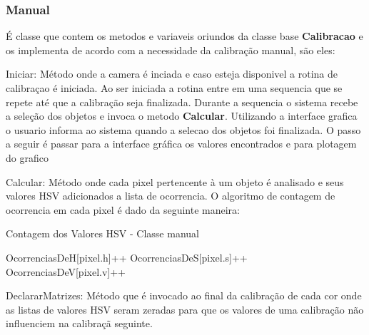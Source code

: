 \subsubsection{Manual}
 É classe que contem os metodos e variaveis oriundos da classe base \textbf{Calibracao} e os implementa de acordo com a necessidade da calibração manual, são eles:
		\begin{description}
		\item Iniciar: Método onde a camera é inciada e caso esteja disponivel a rotina de calibraçao é iniciada. Ao ser iniciada a rotina entre em uma sequencia que se repete até que a calibração seja finalizada. Durante a sequencia o sistema recebe a seleção dos objetos e invoca o metodo \textbf{Calcular}. Utilizando a interface grafica o usuario informa ao sistema quando a selecao dos objetos foi finalizada. O passo a seguir é passar para a interface gráfica os valores encontrados e para plotagem do grafico  
		
		
		\item Calcular: Método onde cada pixel pertencente à um objeto é analisado e seus valores HSV adicionados a lista de ocorrencia. 
		O algoritmo de contagem de ocorrencia em cada pixel é dado da seguinte maneira:
 
	        \begin{algorithm}
	       		 \caption{Contagem dos Valores HSV - Classe manual}
		        \begin{algorithmic}
		   				 \State OcorrenciasDeH[pixel.h]++ 
		    			 \State	OcorrenciasDeS[pixel.s]++ 
		     	  		 \State	OcorrenciasDeV[pixel.v]++
		     	   \EndFor
		     
	         \end{algorithmic}
	        \end{algorithm}
	     	\item DeclararMatrizes: Método que é invocado ao final da calibração de cada cor onde as listas de valores HSV seram zeradas para que os valores de uma calibração não influenciem na calibraçã seguinte.
		\end{description}

